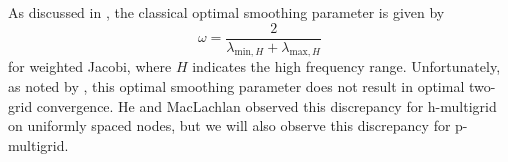 As discussed in \cite{he2020two}, the classical optimal smoothing parameter is given by
\begin{equation}
\omega = \frac{2}{\lambda_{\text{min}, H} + \lambda_{\text{max}, H}}
\end{equation}
for weighted Jacobi, where $H$ indicates the high frequency range.
Unfortunately, as noted by \cite{he2020two}, this optimal smoothing parameter does not result in optimal two-grid convergence.
He and MacLachlan observed this discrepancy for h-multigrid on uniformly spaced nodes, but we will also observe this discrepancy for p-multigrid.
